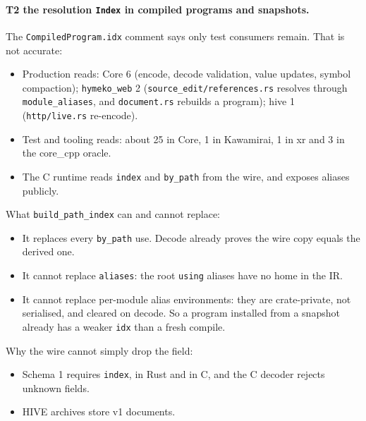 \documentclass[11pt,a4paper]{article}
\newcommand{\code}[1]{\texttt{#1}}
\begin{document}
\paragraph{T2 the resolution \code{Index} in compiled programs and snapshots.} The \code{CompiledProgram.idx} comment
says only test consumers remain. That is not accurate:
\begin{itemize}[nosep]
\item Production reads: Core 6 (encode, decode validation, value updates, symbol compaction);
  \code{hymeko\_web} 2 (\code{source\_edit/references.rs} resolves through \code{module\_aliases}, and
  \code{document.rs} rebuilds a program); hive 1 (\code{http/live.rs} re-encode).
\item Test and tooling reads: about 25 in Core, 1 in Kawamirai, 1 in xr and 3 in the core\_cpp oracle.
\item The C runtime reads \code{index} and \code{by\_path} from the wire, and exposes aliases publicly.
\end{itemize}

What \code{build\_path\_index} can and cannot replace:
\begin{itemize}[nosep]
\item It replaces every \code{by\_path} use. Decode already proves the wire copy equals the derived one.
\item It cannot replace \code{aliases}: the root \code{using} aliases have no home in the IR.
\item It cannot replace per-module alias environments: they are crate-private, not serialised, and cleared on
  decode. So a program installed from a snapshot already has a weaker \code{idx} than a fresh compile.
\end{itemize}

Why the wire cannot simply drop the field:
\begin{itemize}[nosep]
\item Schema 1 requires \code{index}, in Rust and in C, and the C decoder rejects unknown fields.
\item HIVE archives store v1 documents.
\end{itemize}
\end{document}
